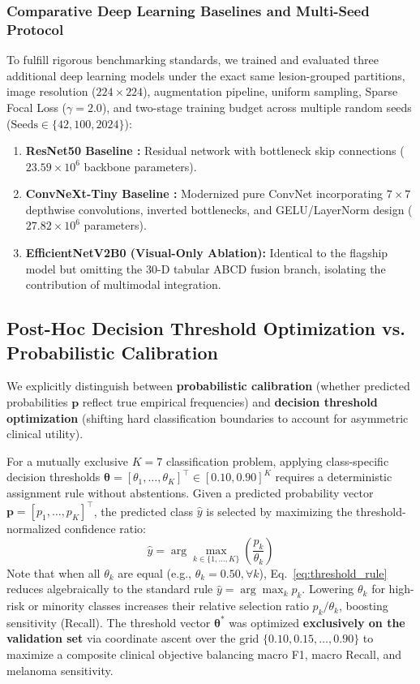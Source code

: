 \documentclass[11pt,a4paper]{article}
\begin{document}
\subsubsection{Comparative Deep Learning Baselines and Multi-Seed Protocol}
To fulfill rigorous benchmarking standards, we trained and evaluated three additional deep learning models under the exact same lesion-grouped partitions, image resolution ($224 \times 224$), augmentation pipeline, uniform sampling, Sparse Focal Loss ($\gamma=2.0$), and two-stage training budget across multiple random seeds ($\text{Seeds} \in \{42, 100, 2024\}$):
\begin{enumerate}
    \item \textbf{ResNet50 Baseline \cite{he2016}:} Residual network with bottleneck skip connections ($23.59 \times 10^6$ backbone parameters).
    \item \textbf{ConvNeXt-Tiny Baseline \cite{liu2022}:} Modernized pure ConvNet incorporating $7 \times 7$ depthwise convolutions, inverted bottlenecks, and GELU/LayerNorm design ($27.82 \times 10^6$ parameters).
    \item \textbf{EfficientNetV2B0 (Visual-Only Ablation):} Identical to the flagship model but omitting the 30-D tabular ABCD fusion branch, isolating the contribution of multimodal integration.
\end{enumerate}

\subsection{Post-Hoc Decision Threshold Optimization vs. Probabilistic Calibration}
We explicitly distinguish between \textbf{probabilistic calibration} (whether predicted probabilities $\mathbf{p}$ reflect true empirical frequencies) and \textbf{decision threshold optimization} (shifting hard classification boundaries to account for asymmetric clinical utility).

For a mutually exclusive $K=7$ classification problem, applying class-specific decision thresholds $\boldsymbol{\theta} = [\theta_1, \dots, \theta_K]^\top \in [0.10, 0.90]^K$ requires a deterministic assignment rule without abstentions. Given a predicted probability vector $\mathbf{p} = [p_1, \dots, p_K]^\top$, the predicted class $\hat{y}$ is selected by maximizing the threshold-normalized confidence ratio:
\begin{equation}
    \hat{y} = \arg\max_{k \in \{1, \dots, K\}} \left( \frac{p_k}{\theta_k} \right)
    \label{eq:threshold_rule}
\end{equation}
Note that when all $\theta_k$ are equal (e.g., $\theta_k = 0.50, \forall k$), Eq.~\eqref{eq:threshold_rule} reduces algebraically to the standard rule $\hat{y} = \arg\max_k p_k$. Lowering $\theta_k$ for high-risk or minority classes increases their relative selection ratio $p_k / \theta_k$, boosting sensitivity (Recall). The threshold vector $\boldsymbol{\theta}^*$ was optimized \textbf{exclusively on the validation set} via coordinate ascent over the grid $\{0.10, 0.15, \dots, 0.90\}$ to maximize a composite clinical objective balancing macro F1, macro Recall, and melanoma sensitivity.
\end{document}
